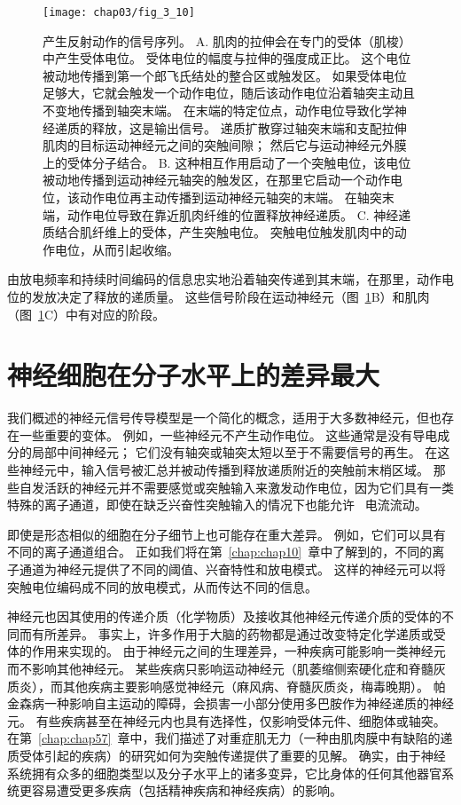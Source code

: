 \begin{figure}[htbp]
	\centering
	\texttt{[image: chap03/fig\_3\_10]}
	\caption{产生反射动作的信号序列。
		A. 肌肉的拉伸会在专门的受体（肌梭）中产生受体电位。 
		受体电位的幅度与拉伸的强度成正比。 
		这个电位被动地传播到第一个郎飞氏结处的整合区或触发区。
		如果受体电位足够大，它就会触发一个动作电位，随后该动作电位沿着轴突主动且不变地传播到轴突末端。
		在末端的特定位点，动作电位导致化学神经递质的释放，这是输出信号。
		递质扩散穿过轴突末端和支配拉伸肌肉的目标运动神经元之间的突触间隙；
		然后它与运动神经元外膜上的受体分子结合。
		B. 这种相互作用启动了一个突触电位，该电位被动地传播到运动神经元轴突的触发区，在那里它启动一个动作电位，该动作电位再主动传播到运动神经元轴突的末端。
		在轴突末端，动作电位导致在靠近肌肉纤维的位置释放神经递质。
		C. 神经递质结合肌纤维上的受体，产生突触电位。
		突触电位触发肌肉中的动作电位，从而引起收缩。}
	\label{fig:3_10}
\end{figure}


由放电频率和持续时间编码的信息忠实地沿着轴突传递到其末端，在那里，动作电位的发放决定了释放的递质量。 
这些信号阶段在运动神经元（图~\ref{fig:3_10}B）和肌肉（图~\ref{fig:3_10}C）中有对应的阶段。


\section{神经细胞在分子水平上的差异最大}
我们概述的神经元信号传导模型是一个简化的概念，适用于大多数神经元，但也存在一些重要的变体。
例如，一些神经元不产生动作电位。 
这些通常是没有导电成分的局部中间神经元； 它们没有轴突或轴突太短以至于不需要信号的再生。 
在这些神经元中，输入信号被汇总并被动传播到释放递质附近的突触前末梢区域。 
那些自发活跃的神经元并不需要感觉或突触输入来激发动作电位，因为它们具有一类特殊的离子通道，即使在缺乏兴奋性突触输入的情况下也能允许~ 电流流动。


即使是形态相似的细胞在分子细节上也可能存在重大差异。
例如，它们可以具有不同的离子通道组合。
正如我们将在第~\ref{chap:chap10}~章中了解到的，不同的离子通道为神经元提供了不同的阈值、兴奋特性和放电模式。
这样的神经元可以将突触电位编码成不同的放电模式，从而传达不同的信息。


神经元也因其使用的传递介质（化学物质）及接收其他神经元传递介质的受体的不同而有所差异。
事实上，许多作用于大脑的药物都是通过改变特定化学递质或受体的作用来实现的。 
由于神经元之间的生理差异，一种疾病可能影响一类神经元而不影响其他神经元。 
某些疾病只影响运动神经元（肌萎缩侧索硬化症和脊髓灰质炎），而其他疾病主要影响感觉神经元（麻风病、脊髓灰质炎，梅毒晚期）。
帕金森病一种影响自主运动的障碍，会损害一小部分使用多巴胺作为神经递质的神经元。 
有些疾病甚至在神经元内也具有选择性，仅影响受体元件、细胞体或轴突。
在第~\ref{chap:chap57}~章中，我们描述了对重症肌无力（一种由肌肉膜中有缺陷的递质受体引起的疾病）的研究如何为突触传递提供了重要的见解。
确实，由于神经系统拥有众多的细胞类型以及分子水平上的诸多变异，它比身体的任何其他器官系统更容易遭受更多疾病（包括精神疾病和神经疾病）的影响。


